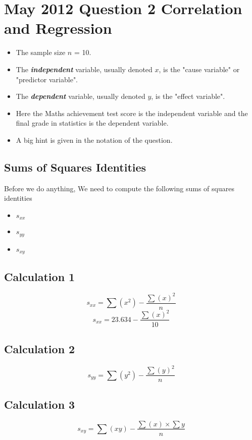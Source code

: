 \documentclass[a4paper,12pt]{article}
\begin{document}
\large


\section*{May 2012 Question 2 Correlation and Regression}
\begin{itemize}
\item The sample size $n$ = 10.
\item The \textbf{\textit{independent}} variable, usually denoted $x$, is the "cause variable" or "predictor variable".
\item The \textbf{\textit{dependent}} variable, usually denoted $y$, is the "effect variable".
\item Here the Maths achievement test score is the independent variable and the final grade in statistics is the dependent variable.
\item A big hint is given in the notation of the question.
\end{itemize}


\subsection*{Sums of Squares Identities}
Before we do anything, We need to compute the following sums of squares identities
\begin{itemize}
\item $s_{xx}$
\item $s_{yy}$
\item $s_{xy}$
\end{itemize}
\subsection*{Calculation 1}
\[ s_{xx}  = \sum(x^2) - \frac{\sum(x)^2}{n} \]
\[ s_{xx}  = 23.634 - \frac{\sum(x)^2}{10} \]

\subsection*{Calculation 2}
\[ s_{yy}  = \sum(y^2) - \frac{\sum(y)^2}{n} \]


\subsection*{Calculation 3}
\[ s_{xy}  = \sum(xy) - \frac{\sum(x)\times \sum{y}}{n} \]
\end{document}
